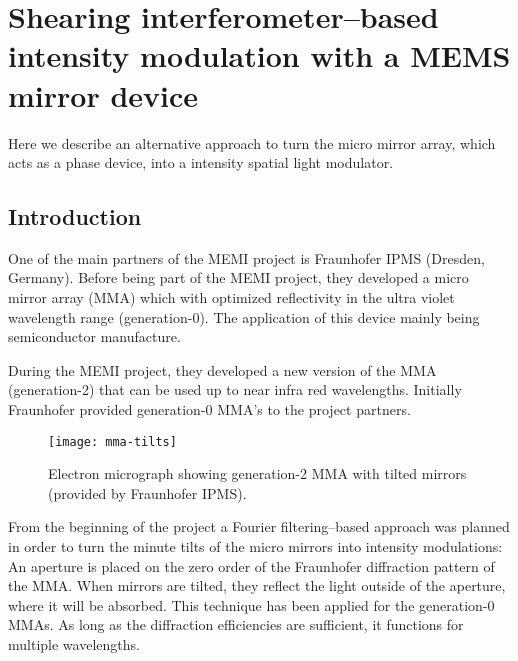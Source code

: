 \chapter{Shearing interferometer--based intensity modulation with a
  MEMS mirror device}
\lstset{language=Maxima}
\begin{summary}
  Here we describe an alternative approach to turn the micro mirror
  array, which acts as a phase device, into a intensity spatial light
  modulator. 
\end{summary}
\section{Introduction}
One of the main partners of the MEMI project is Fraunhofer IPMS
(Dresden, Germany). Before being part of the MEMI project, they
developed a micro mirror array (MMA) which with optimized reflectivity
in the ultra violet wavelength range (generation-0). The application
of this device mainly being semiconductor manufacture.

During the MEMI project, they developed a new version of the MMA
(generation-2) that can be used up to near infra red
wavelengths. Initially Fraunhofer provided generation-0 MMA's to the
project partners.
\begin{figure}[htbp]
  \centering
  \texttt{[image: mma-tilts]}
  \caption{Electron micrograph showing generation-2 MMA with tilted
    mirrors (provided by Fraunhofer IPMS).}
  \label{fig:mma-tilts}
\end{figure}
From the beginning of the project a Fourier filtering--based approach
was planned in order to turn the minute tilts of the micro mirrors
into intensity modulations: An aperture is placed on the zero order of
the Fraunhofer diffraction pattern of the MMA. When mirrors are
tilted, they reflect the light outside of the aperture, where it will
be absorbed.  This technique has been applied for the generation-0
MMAs. As long as the diffraction efficiencies are sufficient, it
functions for multiple wavelengths.

